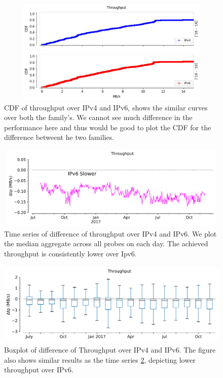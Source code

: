 \begin{figure}[!ht]
	\centering
	\includegraphics[keepaspectratio, height=5cm, width=15cm]{figures/throughput/netflix-throughput-difference-separate.pdf}
	\caption[Throughput CDF over IPv4 and IPv6]{CDF of throughput over IPv4 and IPv6, shows the similar curves over both the family's. We cannot see much difference in the performance here and thus would be good to plot the CDF for the difference betweent he two families.}
	\label{fig:Throughput CDF over IPv4 and IPv6}
\end{figure}
\begin{figure}[!ht]
	\centering
	\includegraphics[keepaspectratio, height=4cm, width=15cm]{figures/throughput/netflix-throughput-timeseries.pdf}
	\caption[Throughput Timeseries]{Time series of difference of throughput over IPv4 and IPv6. We plot the median aggregate across all probes on each day. The achieved throughput is consistently lower over Ipv6.}
	\label{fig:Throughput Timeseries}
\end{figure}
\begin{figure}[!ht]
	\centering
	\includegraphics[keepaspectratio, height=4cm, width=15cm]{figures/throughput/netflix-throughput-boxplot.pdf}
	\caption[Throughput Boxplot]{Boxplot of difference of Throughput over IPv4 and IPv6. The figure also shows similar results as the time series \cref{fig:Throughput Timeseries}, depicting lower throughput over IPv6.}
	\label{fig:Throughput Boxplot}
\end{figure}
\FloatBarrier

